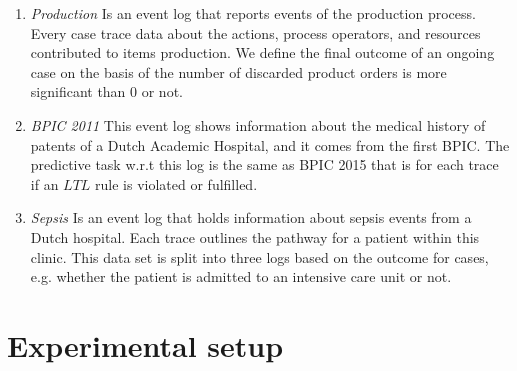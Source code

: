 \begin{enumerate}
	\item \textit{Production }
	Is an event log that reports events of the production process. Every case trace data about the actions, process operators, and resources contributed to items production. We define the final outcome of an ongoing case on the basis of the number of discarded product orders is  more significant than $0$ or not.
	
	
	\item \textit{BPIC 2011 }
	This event log shows information about the medical history of patents of a Dutch Academic Hospital, and it comes from the first BPIC. The predictive task w.r.t this log is the same as BPIC 2015 that is for each trace if an $LTL$ rule \cite{pnueli1977temporal} is violated or fulfilled.
	
	
	\item \textit{Sepsis }
	Is an event log that holds information about sepsis events from a Dutch hospital. Each trace outlines the pathway for a patient within this clinic. This data set is split into three logs based on the outcome for cases, e.g. whether the patient is admitted to an intensive care unit or not.
	

\end{enumerate}

\section{Experimental setup}


